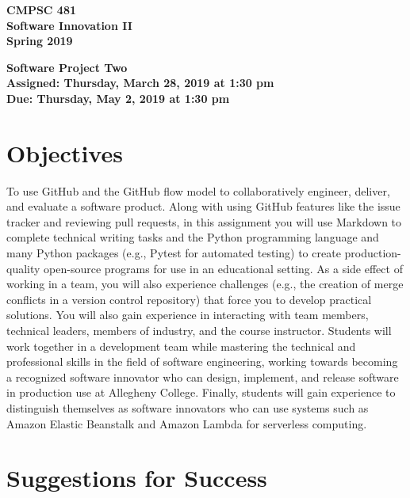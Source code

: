\documentclass[11pt]{article}
\newcommand{\assignmentduedate}{May 2}
\newcommand{\assignmentassignedate}{March 28}
\newcommand{\assignmentnumber}{Two}
\newcommand{\labyear}{2019}
\newcommand{\labdueday}{Thursday}
\newcommand{\labassignday}{Thursday}
\newcommand{\labtime}{1:30 pm}
\newcommand{\assigneddate}{Assigned: \labassignday, \assignmentassignedate, \labyear{} at \labtime{}}
\newcommand{\duedate}{Due: \labdueday, \assignmentduedate, \labyear{} at \labtime{}}
\newcommand{\labtitle}[1]
{
  \begin{center}
    \begin{center}
      \bf
      CMPSC 481\\Software Innovation II\\
      Spring 2019\\
      \medskip
    \end{center}
    \bf
    #1
  \end{center}
}
\begin{document}
\thispagestyle{empty}

\labtitle{Software Project \assignmentnumber{} \\ \assigneddate{} \\ \duedate{}}

\section*{Objectives}

To use GitHub and the GitHub flow model to collaboratively engineer, deliver,
and evaluate a software product.
%
Along with using GitHub features like the issue tracker and reviewing pull
requests, in this assignment you will use Markdown to complete technical writing
tasks and the Python programming language and many Python packages (e.g., Pytest
for automated testing) to create production-quality open-source programs for use
in an educational setting.
%
As a side effect of working in a team, you will also experience challenges
(e.g., the creation of merge conflicts in a version control repository) that
force you to develop practical solutions.
%
You will also gain experience in interacting with team members, technical
leaders, members of industry, and the course instructor.
%
Students will work together in a development team while mastering the technical
and professional skills in the field of software engineering, working towards
becoming a recognized software innovator who can design, implement, and release
software in production use at Allegheny College.
%
Finally, students will gain experience to distinguish themselves as software
innovators who can use systems such as Amazon Elastic Beanstalk and Amazon
Lambda for serverless computing.

\section*{Suggestions for Success}
\end{document}
